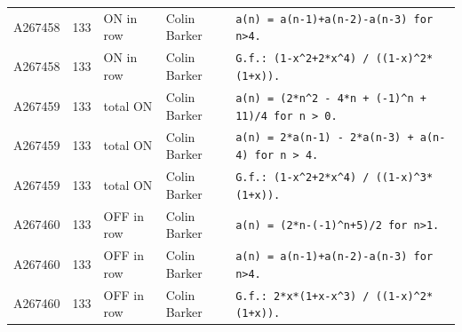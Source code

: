 \documentclass[11pt]{article}
\theoremstyle{definition}
\theoremstyle{remark}
\begin{document}
{\begin{longtable}{p{1.3cm}p{0.7cm}p{2.4cm}p{2.3cm}p{7.3cm}}
A267458 & 133 & ON in row & Colin Barker & \texttt{a(n)\allowbreak{} \allowbreak{}=\allowbreak{} \allowbreak{}a(n-\allowbreak{}1)\allowbreak{}+\allowbreak{}a(n-\allowbreak{}2)\allowbreak{}-\allowbreak{}a(n-\allowbreak{}3)\allowbreak{} \allowbreak{}for \allowbreak{}n>4.} \\
A267458 & 133 & ON in row & Colin Barker & \texttt{G.f.: \allowbreak{}(1-\allowbreak{}x\^{}2+\allowbreak{}2*\allowbreak{}x\^{}4)\allowbreak{} \allowbreak{}/\allowbreak{} \allowbreak{}((1-\allowbreak{}x)\allowbreak{}\^{}2*\allowbreak{}(1+\allowbreak{}x)\allowbreak{})\allowbreak{}.} \\
A267459 & 133 & total ON & Colin Barker & \texttt{a(n)\allowbreak{} \allowbreak{}=\allowbreak{} \allowbreak{}(2*\allowbreak{}n\^{}2 \allowbreak{}-\allowbreak{} \allowbreak{}4*\allowbreak{}n \allowbreak{}+\allowbreak{} \allowbreak{}(-\allowbreak{}1)\allowbreak{}\^{}n \allowbreak{}+\allowbreak{} \allowbreak{}11)\allowbreak{}/\allowbreak{}4 \allowbreak{}for \allowbreak{}n \allowbreak{}> \allowbreak{}0.} \\
A267459 & 133 & total ON & Colin Barker & \texttt{a(n)\allowbreak{} \allowbreak{}=\allowbreak{} \allowbreak{}2*\allowbreak{}a(n-\allowbreak{}1)\allowbreak{} \allowbreak{}-\allowbreak{} \allowbreak{}2*\allowbreak{}a(n-\allowbreak{}3)\allowbreak{} \allowbreak{}+\allowbreak{} \allowbreak{}a(n-\allowbreak{}4)\allowbreak{} \allowbreak{}for \allowbreak{}n \allowbreak{}> \allowbreak{}4.} \\
A267459 & 133 & total ON & Colin Barker & \texttt{G.f.: \allowbreak{}(1-\allowbreak{}x\^{}2+\allowbreak{}2*\allowbreak{}x\^{}4)\allowbreak{} \allowbreak{}/\allowbreak{} \allowbreak{}((1-\allowbreak{}x)\allowbreak{}\^{}3*\allowbreak{}(1+\allowbreak{}x)\allowbreak{})\allowbreak{}.} \\
A267460 & 133 & OFF in row & Colin Barker & \texttt{a(n)\allowbreak{} \allowbreak{}=\allowbreak{} \allowbreak{}(2*\allowbreak{}n-\allowbreak{}(-\allowbreak{}1)\allowbreak{}\^{}n+\allowbreak{}5)\allowbreak{}/\allowbreak{}2 \allowbreak{}for \allowbreak{}n>1.} \\
A267460 & 133 & OFF in row & Colin Barker & \texttt{a(n)\allowbreak{} \allowbreak{}=\allowbreak{} \allowbreak{}a(n-\allowbreak{}1)\allowbreak{}+\allowbreak{}a(n-\allowbreak{}2)\allowbreak{}-\allowbreak{}a(n-\allowbreak{}3)\allowbreak{} \allowbreak{}for \allowbreak{}n>4.} \\
A267460 & 133 & OFF in row & Colin Barker & \texttt{G.f.: \allowbreak{}2*\allowbreak{}x*\allowbreak{}(1+\allowbreak{}x-\allowbreak{}x\^{}3)\allowbreak{} \allowbreak{}/\allowbreak{} \allowbreak{}((1-\allowbreak{}x)\allowbreak{}\^{}2*\allowbreak{}(1+\allowbreak{}x)\allowbreak{})\allowbreak{}.} \\

\end{longtable}}
\end{document}
